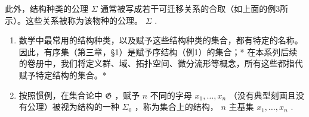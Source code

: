 此外，结构种类的公理 \(\Sigma\) 通常被写成若干可迁移关系的合取（如上面的例3所示）。这些关系被称为该物种的公理。 \(\Sigma\) .

\begin{enumerate}
\def\labelenumi{(\arabic{enumi})}
\setcounter{enumi}{1}
\item
  数学中最常用的结构种类，以及赋予这些结构种类的集合，都有特定的名称。因此，有序集（第三章，§1）是赋予序结构（例1）的集合；* 在本系列后续的卷册中，我们将定义群、域、拓扑空间、微分流形等概念，所有这些都指代赋予特定结构的集合。*
\item
  按照惯例，在集合论中 \(\mathfrak{G}\) ，赋予 \(n\) 不同的字母 \(x_{1},\ldots,x_{n}\) （没有典型刻画且没有公理）被视为结构的一种 \(\Sigma_{0}\) ，称为集合上的结构， \(n\) 主基集 \(x_{1},\ldots,x_{n}\) .
\end{enumerate}

